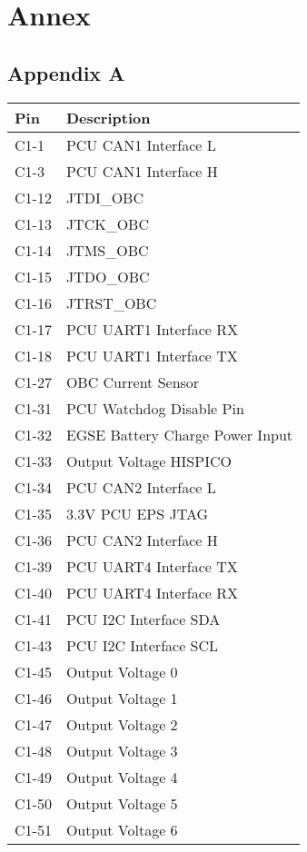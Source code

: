 \chapter{Annex}

\begin{appendix}
	\section*{Appendix A}
	
	\caption{Pin configuration of PC104 connector}
	\begin{longtable}{p{3cm}p{6cm}}
		\toprule
		Pin & Description \\ \midrule
		C1-1 & PCU CAN1 Interface L \\ 
		C1-3 & PCU CAN1 Interface H \\ 
		C1-12 & JTDI\_OBC \\ 
		C1-13 & JTCK\_OBC \\ 
		C1-14 & JTMS\_OBC \\ 
		C1-15 & JTDO\_OBC \\ 
		C1-16 & JTRST\_OBC \\ 
		C1-17 & PCU UART1 Interface RX \\ 
		C1-18 & PCU UART1 Interface TX \\ 
		C1-27 & OBC Current Sensor \\ 
		C1-31 & PCU Watchdog Disable Pin \\ 
		C1-32 & EGSE Battery Charge Power Input \\ 
		C1-33 & Output Voltage HISPICO \\ 
		C1-34 & PCU CAN2 Interface L \\ 
		C1-35 & 3.3V PCU EPS JTAG \\ 
		C1-36 & PCU CAN2 Interface H \\
		C1-39 & PCU UART4 Interface TX \\ 
		C1-40 & PCU UART4 Interface RX \\
		C1-41 & PCU I2C Interface SDA \\ 
		C1-43 & PCU I2C Interface SCL \\ 
		C1-45 & Output Voltage 0 \\ 
		C1-46 & Output Voltage 1 \\ 
		C1-47 & Output Voltage 2 \\ 
		C1-48 & Output Voltage 3 \\ 
		C1-49 & Output Voltage 4 \\ 
		C1-50 & Output Voltage 5 \\ 
		C1-51 & Output Voltage 6 \\ 

\end{longtable}
\end{appendix}
